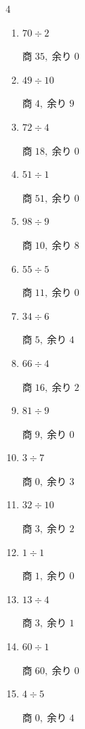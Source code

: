 \begin{multicols}{4}
\begin{enumerate}
        $商\; 25,\; 余り\; 1$

  \item $70 \div 2$

        $商\; 35,\; 余り\; 0$

  \item $49 \div 10$

        $商\; 4,\; 余り\; 9$

  \item $72 \div 4$

        $商\; 18,\; 余り\; 0$

  \item $51 \div 1$

        $商\; 51,\; 余り\; 0$

  \item $98 \div 9$

        $商\; 10,\; 余り\; 8$

  \item $55 \div 5$

        $商\; 11,\; 余り\; 0$

  \item $34 \div 6$

        $商\; 5,\; 余り\; 4$

  \item $66 \div 4$

        $商\; 16,\; 余り\; 2$

  \item $81 \div 9$

        $商\; 9,\; 余り\; 0$

  \item $3 \div 7$

        $商\; 0,\; 余り\; 3$

  \item $32 \div 10$

        $商\; 3,\; 余り\; 2$

  \item $1 \div 1$

        $商\; 1,\; 余り\; 0$

  \item $13 \div 4$

        $商\; 3,\; 余り\; 1$

  \item $60 \div 1$

        $商\; 60,\; 余り\; 0$

  \item $4 \div 5$

        $商\; 0,\; 余り\; 4$


\end{enumerate}
\end{multicols}
